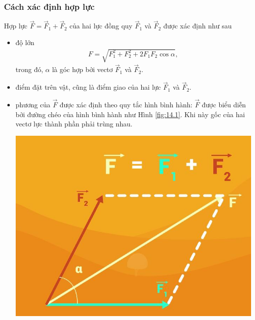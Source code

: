\subsubsection{Cách xác định hợp lực}
Hợp lực $\vec{F}=\vec{F}_1+\vec{F}_2$ của hai lực đồng quy $\vec{F}_1$ và $\vec{F}_2$ được xác định như sau
\begin{itemize}
	\item độ lớn 
	\begin{align*}
		F=\sqrt{F_1^2+F_2^2+2F_1F_2\cos \alpha},
	\end{align*}
	trong đó, $\alpha$ là góc hợp bởi vectơ $\vec{F}_1$ và $\vec{F}_2$.
	\item điểm đặt trên vật, cũng là điểm giao của hai lực $\vec{F}_1$ và $\vec{F}_2$.
	\item phương của $\vec{F}$ được xác định theo quy tắc hình bình hành: $\vec{F}$ được biểu diễn bởi đường chéo của hình bình hành như Hình \ref{fig:14.1}. Khi này gốc của hai vectơ lực thành phần phải trùng nhau.
	\begin{center}
		\includegraphics[scale=0.35]{../figs/VN10-PH-11-L-008-2-V2-01.jpg}
		\label{fig:14.1}
	\end{center}
\end{itemize}

